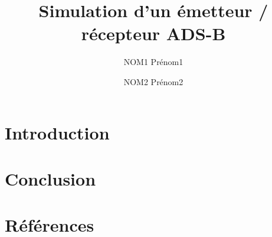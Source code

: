 \documentclass[a4paper]{article}
\title{Simulation d’un émetteur / récepteur ADS-B
}
\author{NOM1 Prénom1 \and NOM2 Prénom2}
\date{}
\begin{document}
\maketitle   %

\tableofcontents %

\section{Introduction}             

\section{Conclusion}

\section{Références}
\end{document}
